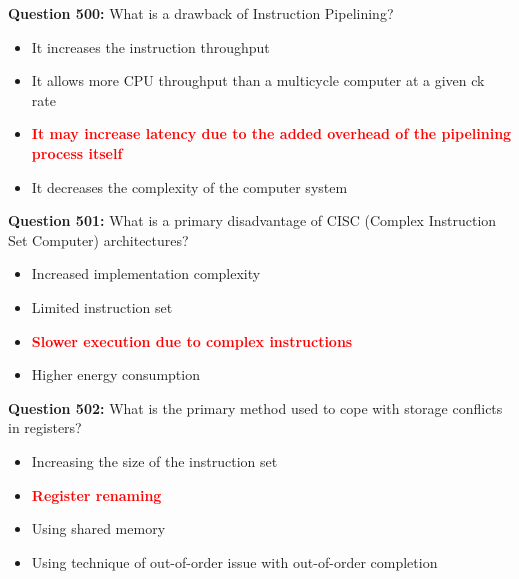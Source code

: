 \documentclass[12pt,a4paper]{article}
\begin{document}
\vspace{0.5cm}

\textbf{Question 500:} What is a drawback of Instruction Pipelining?

\begin{itemize}
    \item[\textbf{A.}] It increases the instruction throughput
    \item[\textbf{B.}] It allows more CPU throughput than a multicycle computer at a given ck rate
    \item[\textbf{C.}] \textcolor{red}{\textbf{It may increase latency due to the added overhead of the pipelining process itself}}
    \item[\textbf{D.}] It decreases the complexity of the computer system
\end{itemize}

\vspace{0.5cm}

\textbf{Question 501:} What is a primary disadvantage of CISC (Complex Instruction Set Computer) architectures?

\begin{itemize}
    \item[\textbf{A.}] Increased implementation complexity
    \item[\textbf{B.}] Limited instruction set
    \item[\textbf{C.}] \textcolor{red}{\textbf{Slower execution due to complex instructions}}
    \item[\textbf{D.}] Higher energy consumption
\end{itemize}

\vspace{0.5cm}

\textbf{Question 502:} What is the primary method used to cope with storage conflicts in registers?

\begin{itemize}
    \item[\textbf{A.}] Increasing the size of the instruction set
    \item[\textbf{B.}] \textcolor{red}{\textbf{Register renaming}}
    \item[\textbf{C.}] Using shared memory
    \item[\textbf{D.}] Using technique of out-of-order issue with out-of-order completion
\end{itemize}

\vspace{0.5cm}
\end{document}
